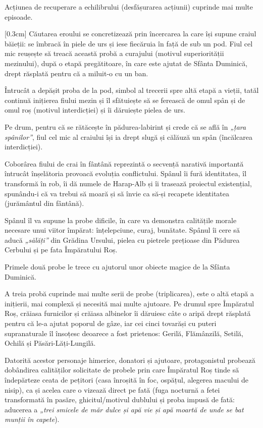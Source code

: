Acțiunea de recuperare a echilibrului (desfășurarea acțiunii) cuprinde mai multe episoade.

[0.3cm]
Căutarea eroului se concretizează prin încercarea la care își supune craiul băieții: se îmbracă în piele de urs și iese fiecăruia în față de sub un pod. Fiul cel mic reușește să treacă această probă a curajului (motivul superiorității mezinului), după o etapă pregătitoare, în care este ajutat de Sfânta Duminică, drept răsplată pentru că a \hbox{miluit-o} cu un ban.

Întrucât a depășit proba de la pod, simbol al trecerii spre altă etapă a vieții, tatăl continuă inițierea fiului mezin și îl sfătuiește să se ferească de omul spân și de omul roș (motivul interdicției) și îi dăruiește pielea de urs.

Pe drum, pentru că se rătăcește în pădurea-labirint și crede că se află în \textit{„țara spânilor”}, fiul cel mic al craiului își ia drept slugă și călăuză un spân (încălcarea interdicției).

Coborârea fiului de crai în fântână reprezintă o secvență narativă importantă întrucât înșelătoria provoacă evoluția conflictului. Spânul îi fură identitatea, îl transformă în rob, îi dă numele de Harap-Alb și îi trasează proiectul existențial, spunându-i că va trebui să moară și să învie ca să-și recapete identitatea (jurământul din fântână).

Spânul îl va supune la probe dificile, în care va demonstra calitățile morale necesare unui viitor împărat: înțelepciune, curaj, bunătate. Spânul îi cere să aducă \textit{„sălăți”} din Grădina Ursului, pielea cu pietrele prețioase din Pădurea Cerbului și pe fata Împăratului Roș.

Primele două probe le trece cu ajutorul unor obiecte magice de la Sfânta Duminică.

A treia probă cuprinde mai multe serii de probe (triplicarea), este o altă etapă a inițierii, mai complexă și necesită mai multe ajutoare. Pe drumul spre Împăratul Roș, crăiasa furnicilor și crăiasa albinelor îi dăruiesc câte o aripă drept răsplată pentru că le-a ajutat poporul de gâze, iar cei cinci tovarăși cu puteri supranaturale îl însoțesc deoarece a fost prietenos: Gerilă, Flămânzilă, Setilă, Ochilă și Păsări-Lăți-Lungilă.

Datorită acestor personaje himerice, donatori și ajutoare, protagonistul probează dobândirea calităților solicitate de probele prin care Împăratul Roș tinde să îndepărteze ceata de pețitori (casa înroșită în foc, ospățul, alegerea macului de nisip), ca și acelea care o vizează direct pe fată (fuga nocturnă a fetei transformată în pasăre, ghicitul/motivul dublului și proba impusă de fată: aducerea a \textit{„trei smicele de măr dulce și apă vie și apă moartă de unde se bat munții în capete}).

